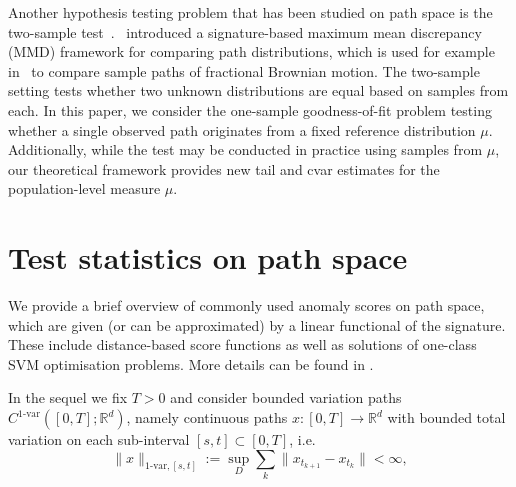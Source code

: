 \documentclass[twoside,11pt]{article}
\numberwithin{equation}{section}
\numberwithin{theorem}{section}
\newcommand{\R}{\mathbb{R}}
\begin{document}
Another hypothesis testing problem that has been studied on path space is the two-sample test~\citep{wynne2022kernel}.~\cite{chevyrev2022signature} introduced a signature-based maximum mean discrepancy (MMD) framework for comparing path distributions, which is used for example in~\cite{andres2024signature} to compare sample paths of fractional Brownian motion. The two-sample setting tests whether two unknown distributions are equal based on samples from each. In this paper, we consider the one-sample goodness-of-fit problem testing whether a single observed path originates from a fixed reference distribution $\mu$. Additionally, while the test may be conducted in practice using samples from $\mu$, our theoretical framework provides new tail and \acrshort{cvar} estimates for the population-level measure $\mu$.

\section{Test statistics on path space}\label{sec:TestStatistics}

We provide a brief overview of commonly used anomaly scores on path space, which are given (or can be approximated) by a linear functional of the signature. These include distance-based score functions as well as solutions of one-class SVM optimisation problems. More details can be found in . 

In the sequel we fix $T>0$ and consider bounded variation paths $C^{1\text{-var}}([0,T];\R^d)$, namely continuous paths $x:[0,T]\rightarrow\R^d$ with bounded total variation on each sub-interval $[s,t]\subset[0,T]$, i.e.
$$
\|x\|_{1\mbox{-var},[s,t]}
:= \sup_{D} \sum_{k}\|x_{t_{k+1}}-x_{t_k}\| < \infty,
$$
\end{document}
